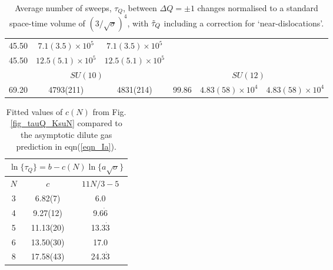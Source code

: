 \documentclass[12pt]{article}
\begin{document}
\begin{table}[htb]
\begin{tabular}{|ccc|ccc|}
 45.50 &  $7.1(3.5)\times 10^5$ & $7.1(3.5)\times 10^5$    &  &   &   \\
 45.50 & $12.5(5.1)\times 10^5$ & $12.5(5.1)\times 10^5$   &  &   &  \\ \hline
\multicolumn{3}{|c|}{$SU(10)$} & \multicolumn{3}{|c|}{$SU(12)$} \\ \hline
  69.20  & 4793(211) & 4831(214)  & 99.86  & $4.83(58)\times 10^4$ &  $4.83(58)\times 10^4$   \\  \hline
\end{tabular}
\caption{Average number of sweeps, $\tau_Q$, between $\Delta Q= \pm 1$ changes normalised to
  a standard space-time volume of $(3/\surd\sigma)^4$, with $\Tilde{\tau}_Q$ including a correction for
`near-dislocations'.}
\label{table_tauQ_SUN}
\end{table}

\begin{table}[htb]
\centering
\begin{tabular}{|c|c|c|} \hline
\multicolumn{3}{|c|}{$\ln\{\tau_Q\} = b - c(N)\ln\{a\surd\sigma\}$} \\ \hline
$N$ & $c$ &  $11N/3 - 5$ \\ \hline
3  & 6.82(7)   &  6.0 \\
4  & 9.27(12)  &  9.6$\dot{6}$ \\
5  & 11.13(20) &  13.3$\dot{3}$ \\
6  & 13.50(30) &  17.0 \\
8  & 17.58(43) &  24.3$\dot{3}$ \\ \hline
 \end{tabular}
\caption{Fitted values of $c(N)$ from Fig.\ref{fig_tauQ_KsuN} compared to the asymptotic
  dilute gas prediction in eqn(\ref{eqn_Ia}).}
\label{table_tauQ_a}
\end{table}
\end{document}
